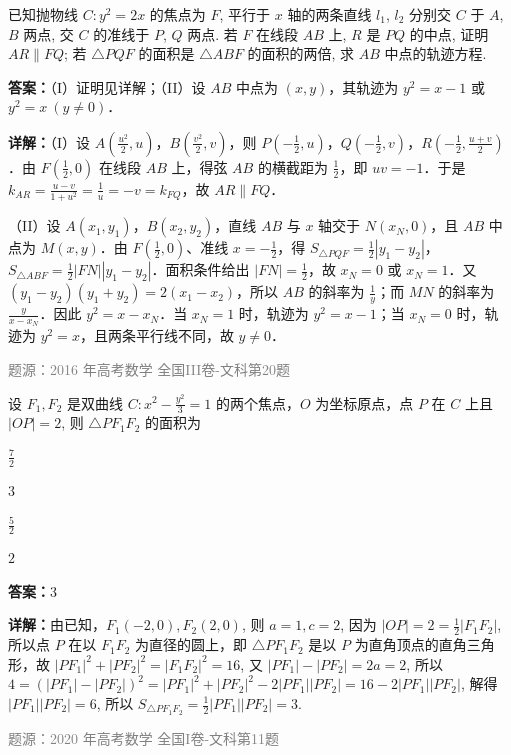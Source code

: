 \begin{question}
已知抛物线 $C: y^2=2x$ 的焦点为 $F$, 平行于 $x$ 轴的两条直线 $l_1$, $l_2$ 分别交 $C$ 于 $A$, $B$ 两点, 交 $C$ 的准线于 $P$, $Q$ 两点.
若 $F$ 在线段 $AB$ 上, $R$ 是 $PQ$ 的中点, 证明 $AR\parallel FQ$;
若 $\triangle PQF$ 的面积是 $\triangle ABF$ 的面积的两倍, 求 $AB$ 中点的轨迹方程.
\begin{solution}
\textbf{答案：}（I）证明见详解；（II）设 $AB$ 中点为 $(x,y)$，其轨迹为 $y^2=x-1$ 或 $y^2=x\ (y\ne0)$．

\textbf{详解：}（I）设 $A\left(\frac{u^2}{2},u\right)$，$B\left(\frac{v^2}{2},v\right)$，则 $P\left(-\frac12,u\right)$，$Q\left(-\frac12,v\right)$，$R\left(-\frac12,\frac{u+v}{2}\right)$．由 $F\left(\frac12,0\right)$ 在线段 $AB$ 上，得弦 $AB$ 的横截距为 $\frac12$，即 $uv=-1$．于是 $k_{AR}=\frac{u-v}{1+u^2}=\frac1u=-v=k_{FQ}$，故 $AR\parallel FQ$．

（II）设 $A(x_1,y_1)$，$B(x_2,y_2)$，直线 $AB$ 与 $x$ 轴交于 $N(x_N,0)$，且 $AB$ 中点为 $M(x,y)$．由 $F\left(\frac12,0\right)$、准线 $x=-\frac12$，得 $S_{\triangle PQF}=\frac12|y_1-y_2|$，$S_{\triangle ABF}=\frac12|FN||y_1-y_2|$．面积条件给出 $|FN|=\frac12$，故 $x_N=0$ 或 $x_N=1$．又 $(y_1-y_2)(y_1+y_2)=2(x_1-x_2)$，所以 $AB$ 的斜率为 $\frac1y$；而 $MN$ 的斜率为 $\frac{y}{x-x_N}$．因此 $y^2=x-x_N$．当 $x_N=1$ 时，轨迹为 $y^2=x-1$；当 $x_N=0$ 时，轨迹为 $y^2=x$，且两条平行线不同，故 $y\ne0$．

\textcolor{gray}{\footnotesize 题源：2016 年高考数学 全国III卷-文科第20题}
\end{solution}
\end{question}


\begin{question}
设 $F_1, F_2$ 是双曲线 $C: x^2 - \frac{y^2}{3} = 1$ 的两个焦点，$O$ 为坐标原点，点 $P$ 在 $C$ 上且 $|OP| = 2$, 则 $\triangle PF_1F_2$ 的面积为
\begin{choices}
\item $\frac{7}{2}$
\item $3$
\item $\frac{5}{2}$
\item $2$
\end{choices}
\begin{solution}
\textbf{答案：}$3$

\textbf{详解：}由已知，$F_1(-2,0), F_2(2,0)$, 则 $a=1, c=2$, 因为 $|OP|=2 = \frac{1}{2}|F_1F_2|$, 所以点 $P$ 在以 $F_1F_2$ 为直径的圆上，即 $\triangle PF_1F_2$ 是以 $P$ 为直角顶点的直角三角形，故 $|PF_1|^2 + |PF_2|^2 = |F_1F_2|^2 = 16$, 又 $|PF_1|-|PF_2|=2a=2$, 所以 $4 = (|PF_1|-|PF_2|)^2 = |PF_1|^2 + |PF_2|^2 - 2|PF_1||PF_2| = 16 - 2|PF_1||PF_2|$, 解得 $|PF_1||PF_2|=6$, 所以 $S_{\triangle PF_1F_2} = \frac{1}{2}|PF_1||PF_2|=3$.

\textcolor{gray}{\footnotesize 题源：2020 年高考数学 全国I卷-文科第11题}
\end{solution}
\end{question}

